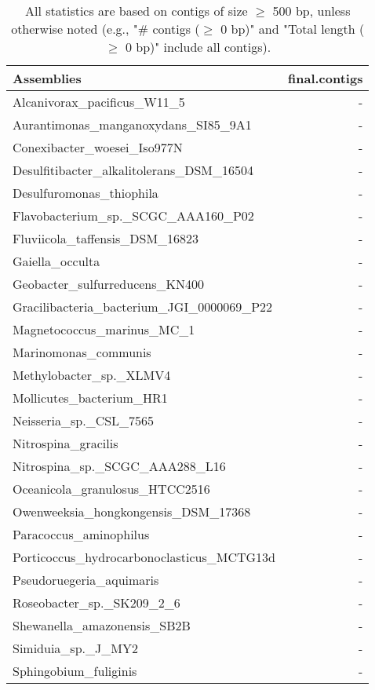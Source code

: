 \documentclass[12pt,a4paper]{article}
\begin{document}
\begin{table}[ht]
\begin{center}
\caption{All statistics are based on contigs of size $\geq$ 500 bp, unless otherwise noted (e.g., "\# contigs ($\geq$ 0 bp)" and "Total length ($\geq$ 0 bp)" include all contigs).}
\begin{tabular}{|l*{1}{|r}|}
\hline
Assemblies & final.contigs \\ \hline
Alcanivorax\_pacificus\_W11\_5 & - \\ \hline
Aurantimonas\_manganoxydans\_SI85\_9A1 & - \\ \hline
Conexibacter\_woesei\_Iso977N & - \\ \hline
Desulfitibacter\_alkalitolerans\_DSM\_16504 & - \\ \hline
Desulfuromonas\_thiophila & - \\ \hline
Flavobacterium\_sp.\_SCGC\_AAA160\_P02 & - \\ \hline
Fluviicola\_taffensis\_DSM\_16823 & - \\ \hline
Gaiella\_occulta & - \\ \hline
Geobacter\_sulfurreducens\_KN400 & - \\ \hline
Gracilibacteria\_bacterium\_JGI\_0000069\_P22 & - \\ \hline
Magnetococcus\_marinus\_MC\_1 & - \\ \hline
Marinomonas\_communis & - \\ \hline
Methylobacter\_sp.\_XLMV4 & - \\ \hline
Mollicutes\_bacterium\_HR1 & - \\ \hline
Neisseria\_sp.\_CSL\_7565 & - \\ \hline
Nitrospina\_gracilis & - \\ \hline
Nitrospina\_sp.\_SCGC\_AAA288\_L16 & - \\ \hline
Oceanicola\_granulosus\_HTCC2516 & - \\ \hline
Owenweeksia\_hongkongensis\_DSM\_17368 & - \\ \hline
Paracoccus\_aminophilus & - \\ \hline
Porticoccus\_hydrocarbonoclasticus\_MCTG13d & - \\ \hline
Pseudoruegeria\_aquimaris & - \\ \hline
Roseobacter\_sp.\_SK209\_2\_6 & - \\ \hline
Shewanella\_amazonensis\_SB2B & - \\ \hline
Simiduia\_sp.\_J\_MY2 & - \\ \hline
Sphingobium\_fuliginis & - \\ \hline

\end{tabular}
\end{center}
\end{table}
\end{document}
